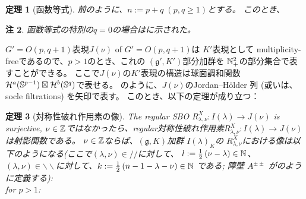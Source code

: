 \documentclass[12pt]{article} %
\newtheorem{theorem}{定理}
\newtheorem{remark}[theorem]{注}
\theoremstyle{definition}
\theoremstyle{exampstyle} \newtheorem{examp}[theorem]{Theorem}
\begin{document}
	\begin{theorem}[函数等式]
	前のように、$n:=p+q\;(p,q\ge1)$とする。
	このとき、
	\end{theorem}
	\begin{remark}
		函数等式の特別の$q=0$の場合は\cite[Thm. 12.6]{kobayashi2015program}に示された。
	\end{remark}
	$G'=O(p,q+1)$表現$J(\nu)$ of $G'=O(p,q+1)$は $K'$表現として multiplicity-freeであるので、$p>1$のとき、これの $(\mathfrak{g}',K')$部分加群を $\mathbb{N}_{+}^2$の部分集合で表すことができる。
	ここで$J(\nu)$の$K'$表現の構造は球面調和関数
	$\mathcal{H}^a(\mathbb{S}^{p-1})\boxtimes\mathcal{H}^b(\mathbb{S}^q)$で表せる。
 	\cite{howe1993homogeneous}のように、$J(\nu)$のJordan--H\"older 列 (或いは、socle filtrations) を矢印で表す。
	このとき、以下の定理が成り立つ：
\begin{theorem}[対称性破れ作用素の像]
	The regular SBO $R_{\lambda,\nu}^X:I(\lambda)\to J(\nu)$ is surjective,
	$\nu\in\mathbb{Z}$ではなかったら、regular対称性破れ作用素$R_{\lambda,\nu}^X:I(\lambda)\to J(\nu)$は射影関数である。
	$\nu\in\mathbb{Z}$ならば、$(\mathfrak{g},K)$加群 $I(\lambda)_K$の
	$R_{\lambda,\nu}^X$における像は以下のようになる(ここで$(\lambda,\nu)\in//$に対して、
	$l:=\frac{1}{2}\left( \nu-\lambda \right)\in\mathbb{N}$、$(\lambda,\nu)\in\backslash\backslash$に対して、$k:=\frac{1}{2}\left( n-1-\lambda-\nu \right)
	\in\mathbb{N}$ である; 障壁 $A^{\pm\pm}$
	が\cite{howe1993homogeneous}のように定義する): \\
	for $p>1$:
\end{theorem}
\end{document}
